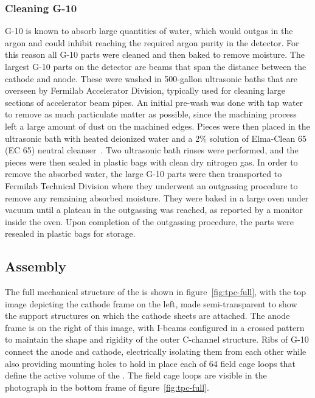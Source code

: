 \subsubsection{Cleaning G-10}

G-10 is known to absorb large quantities of water, which would outgas in the argon and could inhibit reaching the required argon purity in the detector. For this reason all G-10 parts were cleaned and then baked to remove moisture. The largest G-10 parts on the detector are beams that span the distance between the cathode and anode. These were washed in 500-gallon ultrasonic baths that are overseen by Fermilab Accelerator Division, typically used for cleaning large sections of accelerator beam pipes. An initial pre-wash was done with tap water to remove as much particulate matter as possible, since the machining process left a large amount of dust on the machined edges.  Pieces were then placed in the ultrasonic bath with heated deionized water and a 2\% solution of Elma-Clean 65 (EC 65) neutral cleanser~\cite{ElmaClean}. Two ultrasonic bath rinses were performed, and the pieces were then sealed in plastic bags with clean dry nitrogen gas. In order to remove the absorbed water, the large G-10 parts were then transported to Fermilab Technical Division where they underwent an outgassing procedure to remove any remaining absorbed moisture.  They were baked in a large oven under vacuum until a plateau in the outgassing was reached, as reported by a monitor inside the oven. Upon completion of the outgassing procedure, the parts were resealed in plastic bags for storage.

\subsection{Assembly}


The full mechanical structure of the \lartpc is shown in figure~\ref{fig:tpc-full}, with the top image depicting the cathode frame on the left, made semi-transparent to show the support structures on which the cathode sheets are attached. The anode frame is on the right of this image, with I-beams configured in a crossed pattern to maintain the shape and rigidity of the outer C-channel structure. Ribs of G-10 connect the anode and cathode, electrically isolating them from each other while also providing mounting holes to hold in place each of 64 field cage loops that define the active volume of the \lartpc.  The field cage loops are visible in the photograph in the bottom frame of figure~\ref{fig:tpc-full}.

